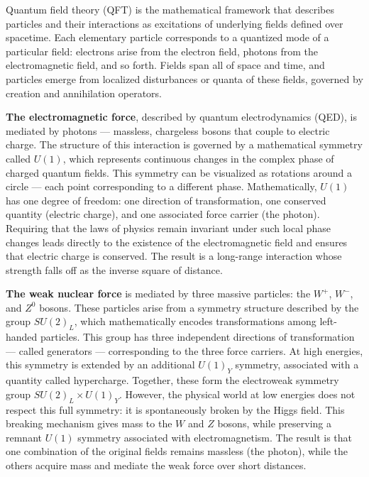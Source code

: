 Quantum field theory (QFT) is the mathematical framework that describes particles and their interactions as excitations of underlying fields defined over spacetime. Each elementary particle corresponds to a quantized mode of a particular field: electrons arise from the electron field, photons from the electromagnetic field, and so forth. Fields span all of space and time, and particles emerge from localized disturbances or quanta of these fields, governed by creation and annihilation operators.

\textbf{The electromagnetic force}, described by quantum electrodynamics (QED), is mediated by photons — massless, chargeless bosons that couple to electric charge. The structure of this interaction is governed by a mathematical symmetry called \(U(1)\), which represents continuous changes in the complex phase of charged quantum fields. This symmetry can be visualized as rotations around a circle — each point corresponding to a different phase. Mathematically, \(U(1)\) has one degree of freedom: one direction of transformation, one conserved quantity (electric charge), and one associated force carrier (the photon). Requiring that the laws of physics remain invariant under such local phase changes leads directly to the existence of the electromagnetic field and ensures that electric charge is conserved. The result is a long-range interaction whose strength falls off as the inverse square of distance.

\textbf{The weak nuclear force} is mediated by three massive particles: the \(W^+\), \(W^-\), and \(Z^0\) bosons. These particles arise from a symmetry structure described by the group \(SU(2)_L\), which mathematically encodes transformations among left-handed particles. This group has three independent directions of transformation — called generators — corresponding to the three force carriers. At high energies, this symmetry is extended by an additional \(U(1)_Y\) symmetry, associated with a quantity called hypercharge. Together, these form the electroweak symmetry group \(SU(2)_L \times U(1)_Y\). However, the physical world at low energies does not respect this full symmetry: it is spontaneously broken by the Higgs field. This breaking mechanism gives mass to the \(W\) and \(Z\) bosons, while preserving a remnant \(U(1)\) symmetry associated with electromagnetism. The result is that one combination of the original fields remains massless (the photon), while the others acquire mass and mediate the weak force over short distances.

